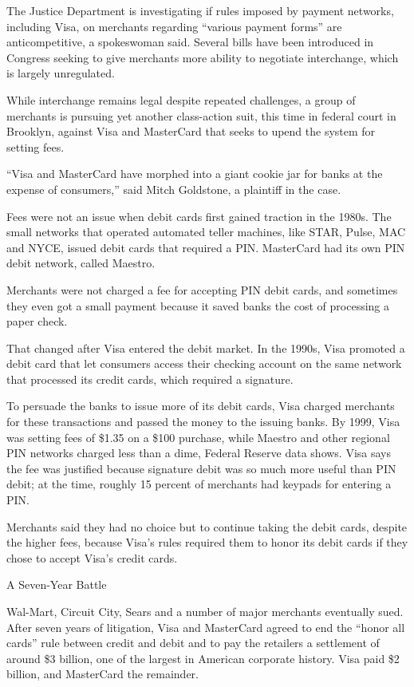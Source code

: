 ﻿\documentclass[12pt]{article}
\begin{document}
The Justice Department is investigating if rules imposed by payment networks, including Visa, on
merchants regarding ``various payment forms'' are anticompetitive, a spokeswoman said. Several bills
have been introduced in Congress seeking to give merchants more ability to negotiate interchange,
which is largely unregulated.

While interchange remains legal despite repeated challenges, a group of merchants is pursuing yet
another class-action suit, this time in federal court in Brooklyn, against Visa and MasterCard that
seeks to upend the system for setting fees.

``Visa and MasterCard have morphed into a giant cookie jar for banks at the expense of consumers,''
said Mitch Goldstone, a plaintiff in the case.

Fees were not an issue when debit cards first gained traction in the 1980s. The small networks that
operated automated teller machines, like STAR, Pulse, MAC and NYCE, issued debit cards that required
a PIN. MasterCard had its own PIN debit network, called Maestro.

Merchants were not charged a fee for accepting PIN debit cards, and sometimes they even got a small
payment because it saved banks the cost of processing a paper check.

That changed after Visa entered the debit market. In the 1990s, Visa promoted a debit card that let
consumers access their checking account on the same network that processed its credit cards, which
required a signature.

To persuade the banks to issue more of its debit cards, Visa charged merchants for these
transactions and passed the money to the issuing banks. By 1999, Visa was setting fees of \$1.35 on
a \$100 purchase, while Maestro and other regional PIN networks charged less than a dime, Federal
Reserve data shows. Visa says the fee was justified because signature debit was so much more useful
than PIN debit; at the time, roughly 15 percent of merchants had keypads for entering a PIN.

Merchants said they had no choice but to continue taking the debit cards, despite the higher fees,
because Visa's rules required them to honor its debit cards if they chose to accept Visa's credit
cards.

A Seven-Year Battle

Wal-Mart, Circuit City, Sears and a number of major merchants eventually sued. After seven years of
litigation, Visa and MasterCard agreed to end the ``honor all cards'' rule between credit and debit
and to pay the retailers a settlement of around \$3 billion, one of the largest in American
corporate history. Visa paid \$2 billion, and MasterCard the remainder.
\end{document}
